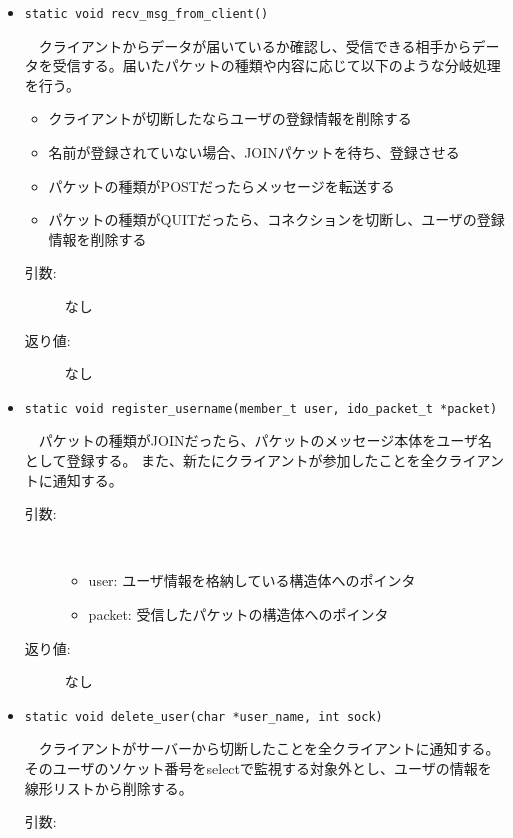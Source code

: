 \documentclass[uplatex,dvipdfmx,11pt,a4paper]{jsarticle} %
\begin{document}
\begin{itemize}
    \item {\tt static void recv\_msg\_from\_client()}

        　クライアントからデータが届いているか確認し、受信できる相手からデータを受信する。届いたパケットの種類や内容に応じて以下のような分岐処理を行う。
        \begin{itemize}
            \item クライアントが切断したならユーザの登録情報を削除する
            \item 名前が登録されていない場合、JOINパケットを待ち、登録させる
            \item パケットの種類がPOSTだったらメッセージを転送する
            \item パケットの種類がQUITだったら、コネクションを切断し、ユーザの登録情報を削除する
        \end{itemize}
        \begin{description}
            \item[引数:] なし
            \item[返り値:] なし
            \newline
        \end{description}

    \item {\tt static void register\_username(member\_t user, ido\_packet\_t *packet)}

        　パケットの種類がJOINだったら、パケットのメッセージ本体をユーザ名として登録する。
        また、新たにクライアントが参加したことを全クライアントに通知する。
        \begin{description}
            \item[引数:] \ 

                \begin{itemize}
                    \item user: ユーザ情報を格納している構造体へのポインタ
                    \item packet: 受信したパケットの構造体へのポインタ
                \end{itemize}
            \item[返り値:] なし
            \newline
        \end{description}

    \item {\tt static void delete\_user(char *user\_name, int sock)}

        　クライアントがサーバーから切断したことを全クライアントに通知する。そのユーザのソケット番号をselectで監視する対象外とし、ユーザの情報を線形リストから削除する。
        \begin{description}
            \item[引数:] \ 


\end{description}
\end{itemize}
\end{document}
